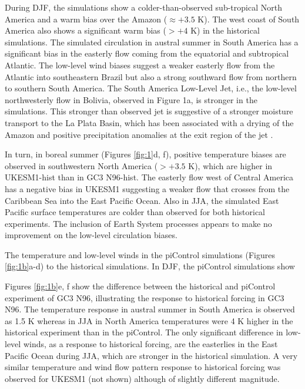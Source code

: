  During DJF, the simulations show a colder-than-observed sub-tropical North America and a warm bias over the Amazon ($\approx +3.5$ K).
 The west coast of South America also shows a significant warm bias ($>+4$ K) in the historical simulations.
 The simulated circulation in austral summer in South America has a significant bias in the easterly flow coming from the equatorial and subtropical Atlantic.
 The low-level wind biases suggest a weaker easterly flow from the Atlantic into southeastern Brazil but also a strong southward flow from northern to southern South America.
  The South America Low-Level Jet, i.e., the low-level northwesterly flow in Bolivia, observed in Figure 1a, is stronger in the simulations.
   This stronger than observed jet is suggestive of a stronger moisture transport to the La Plata Basin, which has been associated with a drying of the Amazon and positive precipitation anomalies at the exit region of the jet \citep{marengo2012,jones2017}.


In turn, in boreal summer (Figures \ref{fig:1}d, f), positive temperature biases are observed in southwestern North America ($>+3.5 $ K), which are higher in UKESM1-hist than in GC3 N96-hist.
 The easterly flow west of Central America has a negative bias in UKESM1 suggesting a weaker flow that crosses from the Caribbean Sea into the East Pacific Ocean.
 Also in JJA, the simulated East Pacific surface temperatures are colder than observed for both historical experiments.      The inclusion of Earth System processes appears to make no  improvement on the low-level circulation biases. 

The temperature and low-level winds in the piControl simulations (Figures \ref{fig:1b}a-d)  to the historical simulations.
 In DJF, the piControl simulations show 
 
 Figures \ref{fig:1b}e, f show the difference between the historical and piControl experiment of GC3 N96, illustrating the response to historical forcing in GC3 N96.
 The temperature response in austral summer in South America is observed as 1.5 K whereas in JJA in North America temperatures were 4 K higher in the historical experiment than in the piControl.
 The only significant difference in low-level winds, as a response to historical forcing, are the easterlies in the East Pacific Ocean during JJA, which are stronger in the historical simulation.
  A very similar temperature and wind flow pattern response to historical forcing was observed for UKESM1 (not shown) although of slightly different magnitude. %

